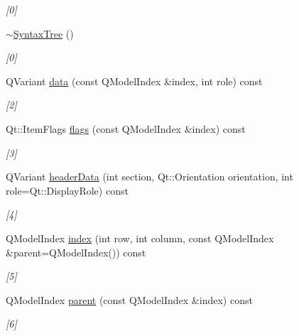 \begin{DoxyCompactItemize}
\begin{DoxyCompactList}\small\item\em \mbox{[}0\mbox{]} \item\end{DoxyCompactList}\item 
\hyperlink{class_syntax_tree_a483f022f28824b8c91d34e650c9ab50a}{$\sim$SyntaxTree} ()
\begin{DoxyCompactList}\small\item\em \mbox{[}0\mbox{]} \item\end{DoxyCompactList}\item 
QVariant \hyperlink{class_syntax_tree_ad3c6ca676fc9e4e32858c536e353a0c7}{data} (const QModelIndex \&index, int role) const 
\begin{DoxyCompactList}\small\item\em \mbox{[}2\mbox{]} \item\end{DoxyCompactList}\item 
Qt::ItemFlags \hyperlink{class_syntax_tree_ac282bea3b4aed0c7089b7c04e9e6d3af}{flags} (const QModelIndex \&index) const 
\begin{DoxyCompactList}\small\item\em \mbox{[}3\mbox{]} \item\end{DoxyCompactList}\item 
QVariant \hyperlink{class_syntax_tree_a4f7e1dffcab1c8aece32cb554d9c04b7}{headerData} (int section, Qt::Orientation orientation, int role=Qt::DisplayRole) const 
\begin{DoxyCompactList}\small\item\em \mbox{[}4\mbox{]} \item\end{DoxyCompactList}\item 
QModelIndex \hyperlink{class_syntax_tree_a84ca97df118ffce2bc4158bff6e661ea}{index} (int row, int column, const QModelIndex \&parent=QModelIndex()) const 
\begin{DoxyCompactList}\small\item\em \mbox{[}5\mbox{]} \item\end{DoxyCompactList}\item 
QModelIndex \hyperlink{class_syntax_tree_a9999efa2828df81635e8d4ba186cc86e}{parent} (const QModelIndex \&index) const 
\begin{DoxyCompactList}\small\item\em \mbox{[}6\mbox{]} \item\end{DoxyCompactList}\item 

\end{DoxyCompactItemize}

